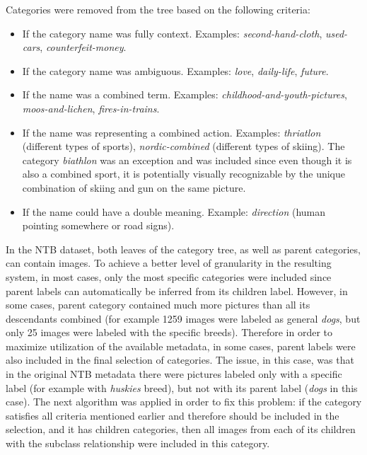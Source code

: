     Categories were removed from the tree based on the following criteria:
    \begin{itemize}
        \item If the category name was fully context. Examples: \textit{second-hand-cloth}, \textit{used-cars}, \textit{counterfeit-money}.
        \item If the category name was ambiguous. Examples: \textit{love}, \textit{daily-life}, \textit{future}.
        \item If the name was a combined term. Examples: \textit{childhood-and-youth-pictures}, \textit{moos-and-lichen}, \textit{fires-in-trains}. %
        \item If the name was representing a combined action. Examples: \textit{thriatlon} (different types of sports), \textit{nordic-combined} (different types of skiing). The category \textit{biathlon} was an exception and was included since even though it is also a combined sport, it is potentially visually recognizable by the unique combination of skiing and gun on the same picture.
        \item If the name could have a double meaning. Example: \textit{direction} (human pointing somewhere or road signs).
    \end{itemize}
    
    In the NTB dataset, both leaves of the category tree, as well as parent categories, can contain images. To achieve a better level of granularity in the resulting system, in most cases, only the most specific categories were included since parent labels can automatically be inferred from its children label. However, in some cases, parent category contained much more pictures than all its descendants combined (for example 1259 images were labeled as general \textit{dogs}, but only 25 images were labeled with the specific breeds). Therefore in order to maximize utilization of the available metadata, in some cases, parent labels were also included in the final selection of categories. The issue, in this case, was that in the original NTB metadata there were pictures labeled only with a specific label (for example with \textit{huskies} breed), but not with its parent label (\textit{dogs} in this case). The next algorithm was applied in order to fix this problem: if the category satisfies all criteria mentioned earlier and therefore should be included in the selection, and it has children categories, then all images from each of its children with the subclass relationship were included in this category.
    
